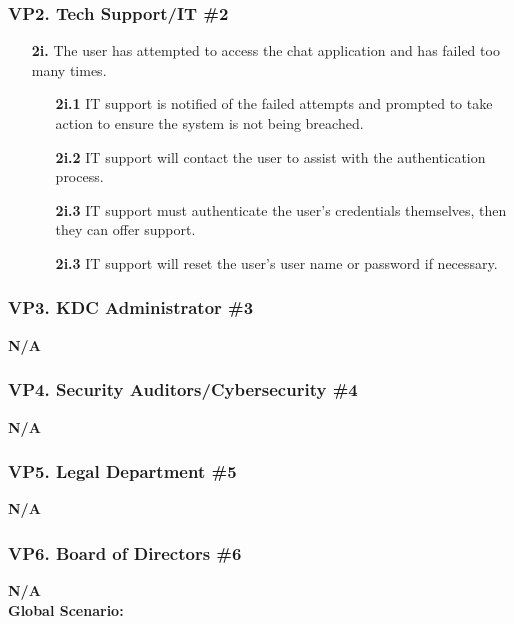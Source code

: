 \documentclass[]{article}
\begin{document}
\subsubsection*{VP2. Tech Support/IT \#2}
\begin{enumerate}
	\item[\textbf{2i.}] The user has attempted to access the chat application and has failed too many times.
		\begin{enumerate}
			\item[\textbf{2i.1}] IT support is notified of the failed attempts and prompted to take action to ensure the system is not being breached.
			\item[\textbf{2i.2}] IT support will contact the user to assist with the authentication process.
			\item[\textbf{2i.3}] IT support must authenticate the user's credentials themselves, then they can offer support.
			\item[\textbf{2i.3}] IT support will reset the user's user name or password if necessary.
		\end{enumerate}
\end{enumerate}
\subsubsection*{VP3. KDC Administrator \#3}
\textbf{N/A}
\subsubsection*{VP4. Security Auditors/Cybersecurity \#4}
\textbf{N/A}
\subsubsection*{VP5. Legal Department \#5}
\textbf{N/A}
\subsubsection*{VP6. Board of Directors \#6}
\textbf{N/A}\\

\noindent \textbf{Global Scenario:}
\end{document}
